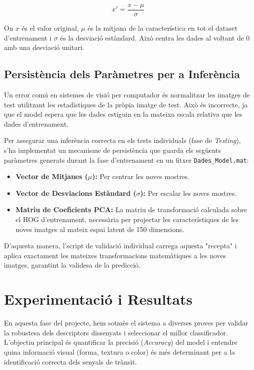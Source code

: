 \documentclass[a4paper,12pt]{article}
\begin{document}
\begin{equation}
    x' = \frac{x - \mu}{\sigma}
\end{equation}

On $x$ és el valor original, $\mu$ és la mitjana de la característica en tot el dataset d'entrenament i $\sigma$ és la desviació estàndard. Això centra les dades al voltant de 0 amb una desviació unitari.

\subsection{Persistència dels Paràmetres per a Inferència}

Un error comú en sistemes de visió per computador és normalitzar les imatges de test utilitzant les estadístiques de la pròpia imatge de test. Això és incorrecte, ja que el model espera que les dades estiguin en la mateixa escala relativa que les dades d'entrenament.

Per assegurar una inferència correcta en els tests individuals (fase de \textit{Testing}), s'ha implementat un mecanisme de persistència que guarda els següents paràmetres generats durant la fase d'entrenament en un fitxer \texttt{Dades\_Model.mat}:

\begin{itemize}
    \item \textbf{Vector de Mitjanes ($\mu$):} Per centrar les noves mostres.
    \item \textbf{Vector de Desviacions Estàndard ($\sigma$):} Per escalar les noves mostres.
    \item \textbf{Matriu de Coeficients PCA:} La matriu de transformació calculada sobre el HOG d'entrenament, necessària per projectar les característiques de les noves imatges al mateix espai latent de 150 dimensions.
\end{itemize}

D'aquesta manera, l'script de validació individual carrega aquesta "recepta" i aplica exactament les mateixes transformacions matemàtiques a les noves imatges, garantint la validesa de la predicció.

\section{Experimentació i Resultats}

En aquesta fase del projecte, hem sotmès el sistema a diverses proves per validar la robustesa dels descriptors dissenyats i seleccionar el millor classificador. L'objectiu principal és quantificar la precisió (\textit{Accuracy}) del model i entendre quina informació visual (forma, textura o color) és més determinant per a la identificació correcta dels senyals de trànsit.
\end{document}
